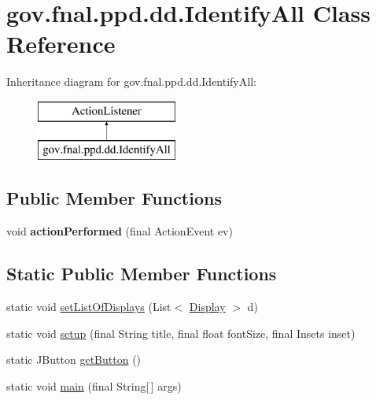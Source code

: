 \hypertarget{classgov_1_1fnal_1_1ppd_1_1dd_1_1IdentifyAll}{\section{gov.\-fnal.\-ppd.\-dd.\-Identify\-All Class Reference}
\label{classgov_1_1fnal_1_1ppd_1_1dd_1_1IdentifyAll}
}
Inheritance diagram for gov.\-fnal.\-ppd.\-dd.\-Identify\-All\-:\begin{figure}[H]
\begin{center}
\leavevmode
\includegraphics[height=2.000000cm]{classgov_1_1fnal_1_1ppd_1_1dd_1_1IdentifyAll}
\end{center}
\end{figure}
\subsection*{Public Member Functions}
\begin{DoxyCompactItemize}
\item 
\hypertarget{classgov_1_1fnal_1_1ppd_1_1dd_1_1IdentifyAll_aaa98b5c9c84be6044758b7646b45c544}{void {\bfseries action\-Performed} (final Action\-Event ev)}\label{classgov_1_1fnal_1_1ppd_1_1dd_1_1IdentifyAll_aaa98b5c9c84be6044758b7646b45c544}

\end{DoxyCompactItemize}
\subsection*{Static Public Member Functions}
\begin{DoxyCompactItemize}
\item 
static void \hyperlink{classgov_1_1fnal_1_1ppd_1_1dd_1_1IdentifyAll_a481aeb17dac457f3707e55e440c7acd7}{set\-List\-Of\-Displays} (List$<$ \hyperlink{interfacegov_1_1fnal_1_1ppd_1_1dd_1_1signage_1_1Display}{Display} $>$ d)
\item 
static void \hyperlink{classgov_1_1fnal_1_1ppd_1_1dd_1_1IdentifyAll_a16820458eeb294d8ad601a7ae37bb43f}{setup} (final String title, final float font\-Size, final Insets inset)
\item 
static J\-Button \hyperlink{classgov_1_1fnal_1_1ppd_1_1dd_1_1IdentifyAll_a688124fec7e6167e589c184e045b83ac}{get\-Button} ()
\item 
static void \hyperlink{classgov_1_1fnal_1_1ppd_1_1dd_1_1IdentifyAll_ac4a1086e71fcfe522dc76b8788223d45}{main} (final String\mbox{[}$\,$\mbox{]} args)
\end{DoxyCompactItemize}


